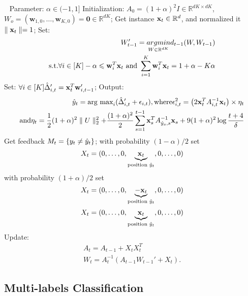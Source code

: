 \begin{algo}[Confidit]
\label{algo:confidit}
\begin{algorithmic}
\STATE	$\ \  $
\STATE Parameter: $\alpha\in(-1,1]$
\STATE Initialization:	$A_0 = (1+\alpha)^2I\in\mathbb{R}^{dK\times dK}$, $W_o = (\mathbf{w}_{1,0},\dots,\mathbf{w}_{K,0}) = \mathbf{0} \in \mathbb{R}^{dK}$;
	\STATE	Get instance $\mathbf{x}_t\in \mathbb{R}^d$, and normalized it $\parallel{\mathbf{x}_t}\parallel = 1$;
    \STATE Set:
    		\[\begin{split}
W_{t-1}' = \underset{W\in\mathbb{R}^{dK}}{ argmin}  d_{t-1} (W,W_{t-1}) \\
\text{s.t.}\forall i\in [K] -\alpha\leqslant \mathbf{w}_i^T\mathbf{x}_t \text{ and } \sum_{i=1}^{K}\mathbf{w}_i^T\mathbf{x}_t = 1+\alpha - K\alpha
\end{split}\]
	\STATE Set: $\forall i\in[K] \hat{\Delta}_{i,t}' = \mathbf{x}_t^T\mathbf{w}_{i,t-1}'$;
    \STATE Output: \[\begin{split}\hat{y}_t = \text{arg max}_i (\hat{\Delta}_{i,t}'+\epsilon_{i,t}), \text{where}  \epsilon_{i,t}^2 = \left( 2\mathbf{x}_t^TA_{i,t}^{-1} \mathbf{x}_t\right)\times \eta_t \\
 \text{and} \eta_t = \frac{1}{2}(1+\alpha)^2\parallel{U}\parallel_2^2 + \frac{(1+\alpha)^2}{2}\sum_{s=1}^{t-1}\mathbf{x}_s^TA_{\hat{y}_s,s}^{-1}\mathbf{x}_s +9(1+\alpha)^2\log{\frac{t+4}{\delta}}\end{split}\]
 	\STATE Get feedback $M_t = \{y_t\neq\hat{y}_t\}$;
    	\STATE	with probability $(1-\alpha)/2$ set
        \STATE	\[X_t = (0,\dots,0,\underset{\text{position } \hat{y}_t}{\underbrace{\mathbf{x}_t}},0,\dots,0)\]
        \STATE with probability $(1+\alpha)/2$ set
        \STATE	\[X_t = (0,\dots,0,\underset{\text{position } \hat{y}_t}{\underbrace{-\mathbf{x}_t}},0,\dots,0)\]
    \ELSE	
    	\STATE	\[X_t = (0,\dots,0,\underset{\text{position } \hat{y}_t}{\underbrace{\mathbf{x}_t}},0,\dots,0)\]
    \ENDIF
   \STATE	Update:
   \STATE	\[\begin{split}
A_t = A_{t-1} + X_tX_t^T \\
W_t = A_t^{-1}(A_{t-1}W_{t-1}' + X_t).
\end{split}\]
\ENDFOR
\end{algorithmic}
\end{algo}

\subsection*{Multi-labels Classification}
